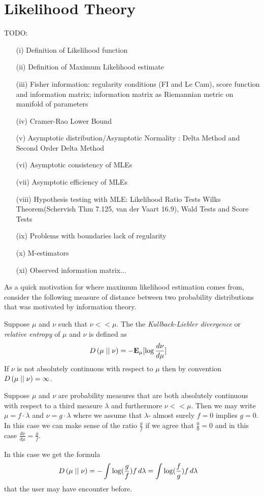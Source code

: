 \section{Likelihood Theory}
TODO:
\begin{itemize}
\item[(i)] Definition of Likelihood function
\item[(ii)] Definition of Maximum Likelihood estimate
\item[(iii)] Fisher information: regularity conditions (FI and Le Cam), score function
  and information matrix; information matrix as Riemannian metric on
  manifold of parameters
\item[(iv)] Cramer-Rao Lower Bound
\item[(v)] Asymptotic distribution/Asymptotic Normality : Delta Method and Second Order Delta Method
\item[(vi)] Asymptotic consistency of MLEs 
\item[(vii)] Asymptotic efficiency of MLEs
\item[(viii)] Hypothesis testing with MLE: Likelihood Ratio Tests 
  Wilks Theorem(Schervish Thm 7.125, van der Vaart 16.9), Wald Tests and Score Tests
\item[(ix)] Problems with boundaries lack of regularity
\item[(x)] M-estimators
\item[(xi)]Observed information matrix...
\end{itemize}

As a quick motivation for where maximum likelihood estimation comes
from, consider the following measure of distance between two
probability distributions that was motivated by information theory.
\begin{defn}Suppose $\mu$ and $\nu$ such that $\nu << \mu$.  The the \emph{Kullback-Liebler divergence} or \emph{relative
    entropy} of $\mu$ and $\nu$ is defined as
\begin{align*}
D\left( \mu \mid\mid \nu \right) &= -\textbf{E}_{\mu}[\log \frac{d\nu}{d\mu}]
\end{align*}
If $\nu$ is not absolutely continuous with respect to $\mu$ then by
convention $D\left( \mu \mid\mid \nu \right) = \infty$.
\end{defn}

\begin{examp}
Suppose $\mu$ and $\nu$ are probability measures that are both
absolutely continuous with respect to a third measure $\lambda$ and
furthermore $\nu << \mu$.  Then we may write $\mu = f \cdot \lambda$
and $\nu = g \cdot \lambda$ where we assume that $\lambda$- almost
surely $f=0$ implies $g=0$.  In this case we can make sense of the
ratio $\frac{g}{f}$ if we agree that $\frac{0}{0} = 0$ and in this
case $\frac{d\nu}{d\mu} = \frac{g}{f}$.

In this case we get the formula 
\begin{align*}
D\left( \mu \mid\mid \nu \right) &= -\int \log(\frac{g}{f}) f \, d\lambda = \int \log(\frac{f}{g}) f \, d\lambda
\end{align*}
that the user may have encounter before.
\end{examp}

